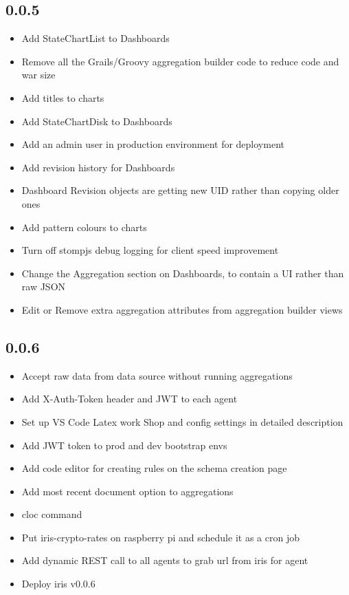 \documentclass[12pt]{report}
\begin{document}
\subsection{0.0.5}
\begin{itemize}
\item Add StateChartList to Dashboards
\item Remove all the Grails/Groovy aggregation builder code to reduce code and war size
\item Add titles to charts
\item Add StateChartDisk to Dashboards
\item Add an admin user in production environment for deployment
\item Add revision history for Dashboards
\item Dashboard Revision objects are getting new UID rather than copying older ones
\item Add pattern colours to charts
\item Turn off stompjs debug logging for client speed improvement
\item Change the Aggregation section on Dashboards, to contain a UI rather than raw JSON
\item Edit or Remove extra aggregation attributes from aggregation builder views
\end{itemize}
\subsection{0.0.6}
\begin{itemize}
\item Accept raw data from data source without running aggregations
\item Add X-Auth-Token header and JWT to each agent
\item Set up VS Code Latex work Shop and config settings in detailed description
\item Add JWT token to prod and dev bootstrap envs
\item Add code editor for creating rules on the schema creation page
\item Add most recent document option to aggregations
\item cloc command
\item Put iris-crypto-rates on raspberry pi and schedule it as a cron job
\item Add dynamic REST call to all agents to grab url  from iris for agent
\item Deploy iris v0.0.6
\end{itemize}
\end{document}
